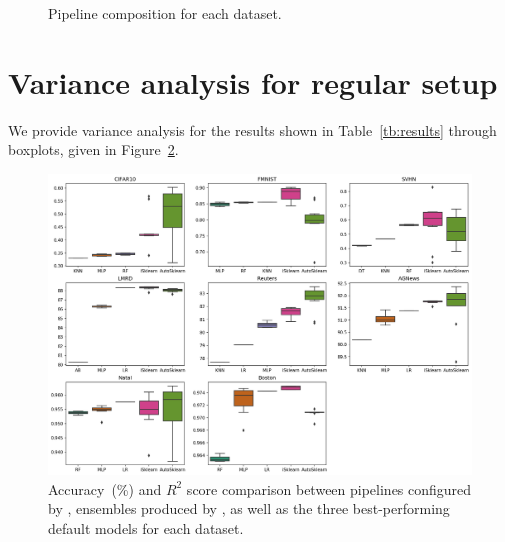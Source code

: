 \begin{figure}
    \caption{Pipeline composition for each dataset.}
    \label{fig:dataset_composition}
\end{figure}

\section{Variance analysis for regular setup}
We provide variance analysis for the results shown in Table~\ref{tb:results} through boxplots, given in Figure~\ref{fig:vanilla-boxplots}.

\begin{figure}
    \centering
    \includegraphics[width=\textwidth]{img/vanilla-boxplots.png}
    \caption{Accuracy~(\%) and $R^2$ score comparison between pipelines configured by \isklearn, ensembles produced by \autosklearn, as well as the three best-performing default models for each dataset.}
    \label{fig:vanilla-boxplots}
\end{figure}